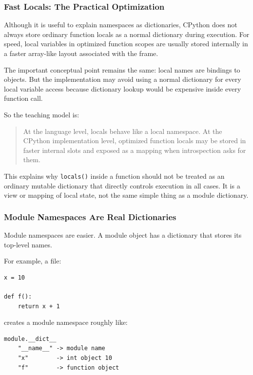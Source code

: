 \subsubsection{Fast Locals: The Practical Optimization}

Although it is useful to explain namespaces as dictionaries, CPython does not always store ordinary function locals as a normal dictionary during execution. For speed, local variables in optimized function scopes are usually stored internally in a faster array-like layout associated with the frame.

The important conceptual point remains the same: local names are bindings to objects. But the implementation may avoid using a normal dictionary for every local variable access because dictionary lookup would be expensive inside every function call.

So the teaching model is:

\begin{quote}
At the language level, locals behave like a local namespace. At the CPython implementation level, optimized function locals may be stored in faster internal slots and exposed as a mapping when introspection asks for them.
\end{quote}

This explains why \texttt{locals()} inside a function should not be treated as an ordinary mutable dictionary that directly controls execution in all cases. It is a view or mapping of local state, not the same simple thing as a module dictionary.

\subsubsection{Module Namespaces Are Real Dictionaries}

Module namespaces are easier. A module object has a dictionary that stores its top-level names.

For example, a file:

\begin{verbatim}
x = 10

def f():
    return x + 1
\end{verbatim}

creates a module namespace roughly like:

\begin{verbatim}
module.__dict__
    "__name__" -> module name
    "x"        -> int object 10
    "f"        -> function object
\end{verbatim}


